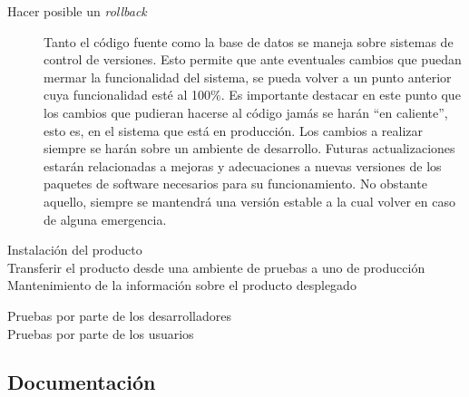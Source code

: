 \begin{description}
\begin{description}
			\item [Hacer posible un \emph{rollback}] Tanto el código fuente como la base de datos se maneja sobre sistemas de control de versiones. Esto permite que ante eventuales cambios que puedan mermar la funcionalidad del sistema, se pueda volver a un punto anterior cuya funcionalidad est\'e al 100\%. Es importante destacar en este punto que los cambios que pudieran hacerse al código jamás se harán ``en caliente'', esto es, en el sistema que está en producción. Los cambios a realizar siempre se harán sobre un ambiente de desarrollo. Futuras actualizaciones estarán relacionadas a mejoras y adecuaciones a nuevas versiones de los paquetes de software necesarios para su funcionamiento. No obstante aquello, siempre se mantendrá una versión estable a la cual volver en caso de alguna emergencia.
			\item [Instalación del producto]
			\item [Transferir el producto desde una ambiente de pruebas a uno de producción]
			\item [Mantenimiento de la información sobre el producto desplegado]
		\end{description}
	\item [Pruebas al producto instalado]
		\begin{description}
			\item [Pruebas por parte de los desarrolladores]
			\item [Pruebas por parte de los usuarios]
		\end{description}
\end{description}

\subsection{Documentación}\label{sec:doc}

